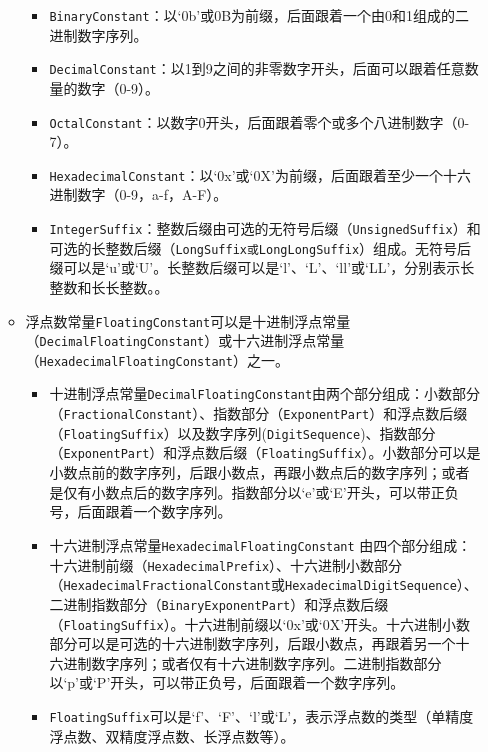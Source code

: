 \documentclass[a4paper, justified]{tufte-handout}
\begin{document}
\begin{solution}
\begin{enumerate}[(1)]
\begin{itemize}
          \begin{itemize}
            \item \texttt{BinaryConstant}：以`0b'或0B为前缀，后面跟着一个由0和1组成的二进制数字序列。
            \item \texttt{DecimalConstant}：以1到9之间的非零数字开头，后面可以跟着任意数量的数字（0-9）。
            \item \texttt{OctalConstant}：以数字0开头，后面跟着零个或多个八进制数字（0-7）。
            \item \texttt{HexadecimalConstant}：以`0x'或`0X'为前缀，后面跟着至少一个十六进制数字（0-9，a-f，A-F）。
            \item \texttt{IntegerSuffix}：整数后缀由可选的无符号后缀（\texttt{UnsignedSuffix}）和可选的长整数后缀（\texttt{LongSuffix或LongLongSuffix}）组成。无符号后缀可以是`u'或`U'。长整数后缀可以是`l'、`L'、`ll'或`LL'，分别表示长整数和长长整数。。
          \end{itemize}
        \item 浮点数常量\texttt{FloatingConstant}可以是十进制浮点常量（\texttt{DecimalFloatingConstant}）或十六进制浮点常量（\texttt{HexadecimalFloatingConstant}）之一。
          \begin{itemize}
            \item 十进制浮点常量\texttt{DecimalFloatingConstant}由两个部分组成：小数部分（\texttt{FractionalConstant}）、指数部分（\texttt{ExponentPart}）和浮点数后缀（\texttt{FloatingSuffix}）以及数字序列(\texttt{DigitSequence})、指数部分（\texttt{ExponentPart}）和浮点数后缀（\texttt{FloatingSuffix}）。小数部分可以是小数点前的数字序列，后跟小数点，再跟小数点后的数字序列；或者是仅有小数点后的数字序列。指数部分以`e'或`E'开头，可以带正负号，后面跟着一个数字序列。
            \item 十六进制浮点常量\texttt{HexadecimalFloatingConstant} 由四个部分组成：十六进制前缀（\texttt{HexadecimalPrefix}）、十六进制小数部分（\texttt{HexadecimalFractionalConstant}或\texttt{HexadecimalDigitSequence}）、二进制指数部分（\texttt{BinaryExponentPart}）和浮点数后缀（\texttt{FloatingSuffix}）。十六进制前缀以`0x'或`0X'开头。十六进制小数部分可以是可选的十六进制数字序列，后跟小数点，再跟着另一个十六进制数字序列；或者仅有十六进制数字序列。二进制指数部分以`p'或`P'开头，可以带正负号，后面跟着一个数字序列。
            \item \texttt{FloatingSuffix}可以是`f'、`F'、`l'或`L'，表示浮点数的类型（单精度浮点数、双精度浮点数、长浮点数等）。
          \end{itemize}

\end{itemize}
\end{enumerate}
\end{solution}
\end{document}
